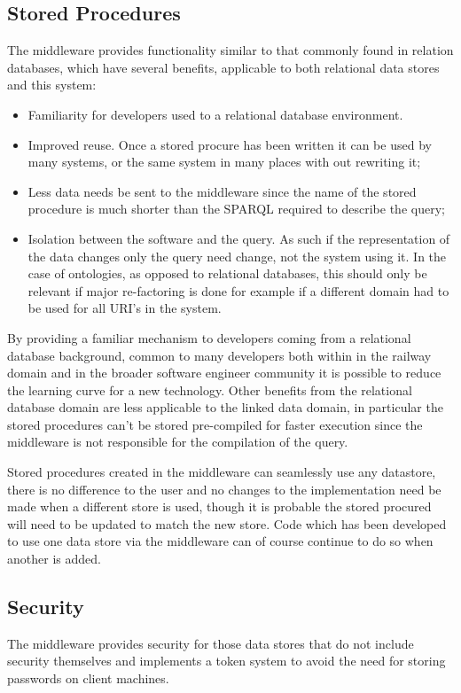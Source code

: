 \subsection{Stored Procedures}
The middleware provides  functionality similar to that commonly found in relation databases, which have several benefits, applicable to both relational data stores and this system:

\begin{itemize}
    \item Familiarity for developers used to a relational database environment. 
    \item Improved reuse. Once a stored procure has been written it can be used by many systems, or the same system in many places with out rewriting it;
    \item Less data needs be sent to the middleware since the name of the stored procedure is much shorter than the SPARQL required to describe the query; 
    \item Isolation between the software and the query. As such if the representation of the data changes only the query need change, not the system using it. In the case of ontologies, as opposed to relational databases, this should only be relevant if major re-factoring is done for example if a different domain had to be used for all URI's in the system.
\end{itemize}

By providing a familiar mechanism to developers coming from a relational database background, common to many developers both within in the railway domain and in the broader software engineer community it is possible to reduce the learning curve for a new technology. Other benefits from the relational database domain are less applicable to the linked data domain, in particular the stored procedures can't be stored pre-compiled for faster execution since the middleware is not responsible for the compilation of the query.

 Stored procedures created in the middleware can seamlessly use any datastore, there is no difference to the user and no changes to the implementation need be made when a different store is used, though it is probable the stored procured will need to be updated to match the new store. Code which has been developed to use one data store via the middleware can of course continue to do so when another is added. 

\subsection{Security}
The middleware provides security for those data stores that do not include security themselves and implements a token system to avoid the need for storing passwords on client machines.

